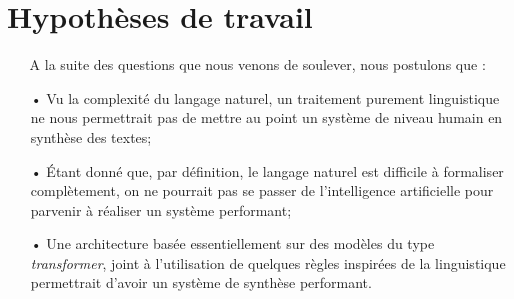 \section{Hypothèses de travail}
$ _{} $ $ _{} $ $ _{} $ $ _{} $ $ _{} $A la suite des questions que nous venons de soulever, nous postulons que :
\begin{itemize}
\item[•] Vu la complexité du langage naturel, un traitement purement linguistique ne nous permettrait pas de mettre au point un système de niveau humain en synthèse des textes;
\item[•] Étant donné que, par définition, le langage naturel est difficile à formaliser com\-plè\-te\-ment, on ne pourrait pas se passer de l'intelligence artificielle pour parvenir à réaliser un système performant;
\item[•] Une architecture basée essentiellement sur des modèles du type \textit{transformer}, joint à l'utilisation de quelques règles inspirées de la linguistique permettrait d'avoir un système de synthèse performant.
\end{itemize}
